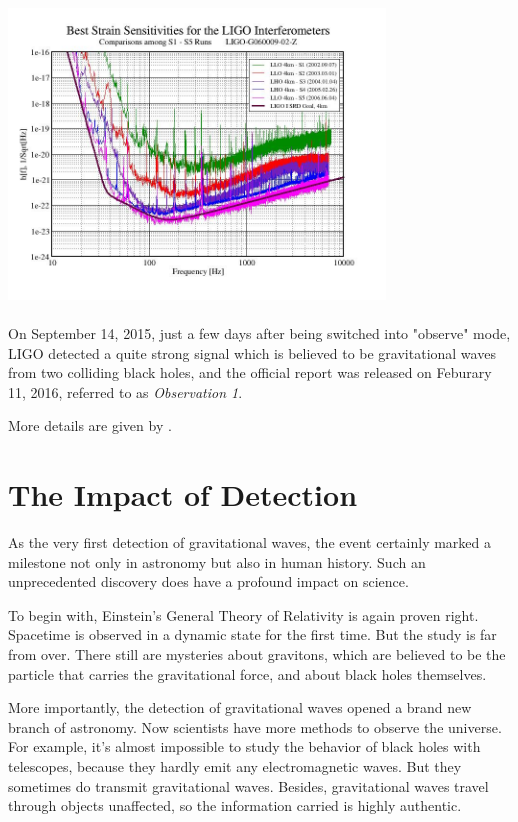 \documentclass[aps,prl,preprint]{revtex4}
\begin{document}
\includegraphics[height = 8cm, width = 10cm]{LIGOsensitivity}

On September 14, 2015, just a few days after being switched into "observe" mode, LIGO detected a quite strong signal which is believed to be gravitational waves from two colliding black holes, and the official report was released on Feburary 11, 2016, referred to as \emph{Observation 1}. \cite{O1}

More details are given by \cite{BHLIGO}.


\section{The Impact of Detection \label{impact}}
As the very first detection of gravitational waves, the event certainly marked a milestone not only in astronomy but also in human history. Such an unprecedented discovery does have a profound impact on science.

To begin with, Einstein's General Theory of Relativity is again proven right. Spacetime is observed in a dynamic state for the first time. But the study is far from over. There still are mysteries about gravitons, which are believed to be the particle that carries the gravitational force, and about black holes themselves. \cite{Impact}

More importantly, the detection of gravitational waves opened a brand new branch of astronomy. Now scientists have more methods to observe the universe. For example, it's almost impossible to study the behavior of black holes with telescopes, because they hardly emit any electromagnetic waves. But they sometimes do transmit gravitational waves. \cite{SBackground} Besides, gravitational waves travel through objects unaffected, \cite{GWTravel} so the information carried is highly authentic.
\end{document}
